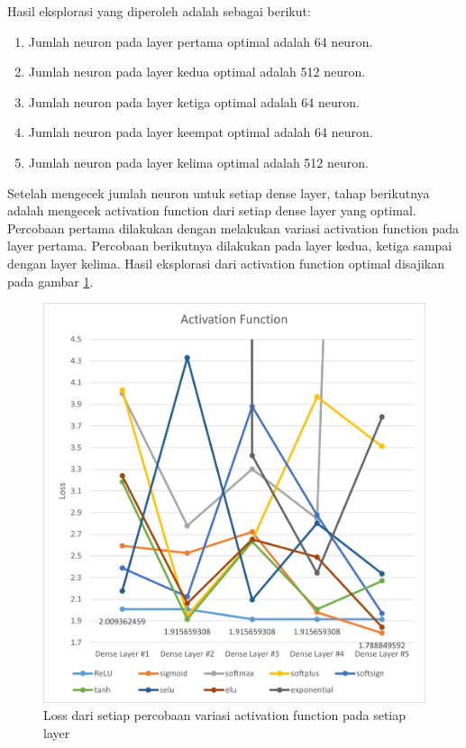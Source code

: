 \documentclass[a4, 12px]{article}
\theoremstyle{definition}
\theoremstyle{remark}
\begin{document}
Hasil eksplorasi yang diperoleh adalah sebagai berikut:
\begin{enumerate}[noitemsep]
	\item Jumlah neuron pada layer pertama optimal adalah 64 neuron.
	\item Jumlah neuron pada layer kedua optimal adalah 512 neuron.
	\item Jumlah neuron pada layer ketiga optimal adalah 64 neuron.
	\item Jumlah neuron pada layer keempat optimal adalah 64 neuron.
	\item Jumlah neuron pada layer kelima optimal adalah 512 neuron.
\end{enumerate}

Setelah mengecek jumlah neuron untuk setiap dense layer, tahap berikutnya adalah mengecek activation function dari setiap dense layer yang optimal. Percobaan pertama dilakukan dengan melakukan variasi activation function pada layer pertama. Percobaan berikutnya dilakukan pada layer kedua, ketiga sampai dengan layer kelima. Hasil eksplorasi dari activation function optimal disajikan pada gambar \ref{fig:R3}.

\begin{figure}[!h]
	\centering
	\includegraphics[width=1\linewidth]{src/R3}
	\caption{Loss dari setiap percobaan variasi activation function pada setiap layer}
	\label{fig:R3}
\end{figure}
\end{document}
